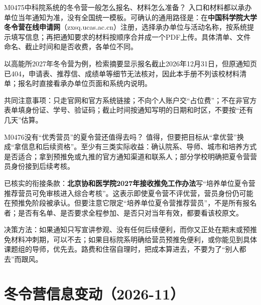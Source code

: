 \begin{qa}{M0475}{中科院系统的冬令营一般怎么报名、材料怎么准备？}
入口和材料都以承办单位当年通知为准，没有全国统一模板。可确认的通用路径是：在\textbf{中国科学院大学冬令营在线申请网}（zxsq.ucas.ac.cn）注册，选择承办单位与活动名称，按系统提示填写信息；再把通知要求的材料按顺序合并成一个PDF上传。具体清单、文件命名、截止时间和是否收费，各单位不同。

以高能所2027年冬令营为例，检索摘要显示报名截止2026年12月31日，但原通知页已404，申请表、推荐信、成绩单等细节无法核对，因此本手册不列该校材料清单；报名时直接看承办单位页面和系统内说明。

共同注意事项：只走官网和官方系统链接；不向个人账户交“占位费”；不在非官方表单填身份证、学号、验证码；截止时间按通知写明的日期和时区，不要按“还有几天”估算。
\end{qa}

\begin{qa}{M0476}{没有“优秀营员”的夏令营还值得去吗？}
值得，但要把目标从“拿优营”换成“拿信息和后续资格”。至少有三类实际收益：确认院系、导师、城市和培养方式是否适合；拿到预推免或九推的官方通知渠道和联系人；部分学校明确把夏令营营员身份接到后续考核。

已核实的衔接条款：\textbf{北京协和医学院2027年接收推免工作办法}写“培养单位夏令营推荐营员可免审核进入综合考核”。这表示即使夏令营不评优营，营员身份仍可能在预推免阶段被承认。但要注意它限定“培养单位夏令营推荐营员”，不是所有报名者；是否有名单、是否要求全程参加、是否只对当年有效，都要看该校原文。

决策方法：如果通知只写宣讲参观、没有任何后续便利，而你又正处在期末或预推免材料冲刺期，可以不去；如果目标院系明确给营员预推免便利，或你能见到具体课题组的导师，优先去。路费和住宿自理时，把成本算进去，不要为了“别人都去”而跟风。
\end{qa}
\section{冬令营信息变动（2026-11）}

